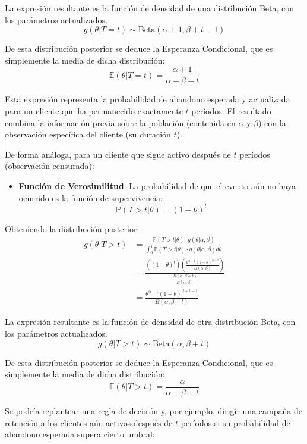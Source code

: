 \documentclass[
]{book}
\providecommand{\tightlist}{%
  \setlength{\itemsep}{0pt}\setlength{\parskip}{0pt}}
\begin{document}
La expresión resultante es la función de densidad de una distribución
Beta, con los parámetros actualizados.
\[g(\theta|T=t) \sim \text{Beta}(\alpha+1, \beta+t-1)\]

De esta distribución posterior se deduce la Esperanza Condicional, que
es simplemente la media de dicha distribución:
\[ \mathbb{E}(\theta|T=t) = \frac{\alpha+1}{\alpha+\beta+t} \]

Esta expresión representa la probabilidad de abandono esperada y
actualizada para un cliente que ha permanecido exactamente \(t\) períodos.
El resultado combina la información previa sobre la población (contenida
en \(\alpha\) y \(\beta\)) con la observación específica del cliente (su
duración \(t\)).

De forma análoga, para un cliente que sigue activo después de \(t\)
períodos (observación censurada):

\begin{itemize}
\tightlist
\item
  \textbf{Función de Verosimilitud}: La probabilidad de que el evento aún
  no haya ocurrido es la función de supervivencia:
  \[ \mathbb{P}(T>t|\theta) = (1-\theta)^{t} \]
\end{itemize}

Obteniendo la distribución posterior: \[
\begin{aligned}
g(\theta|T > t) &= \frac{\mathbb{P}(T > t|\theta) \cdot g(\theta|\alpha, \beta)}{\int_0^1 \mathbb{P}(T > t|\theta) \cdot g(\theta|\alpha, \beta) d\theta} \\
&= \frac{ \left( (1-\theta)^{t} \right) \left( \frac{\theta^{\alpha-1}(1-\theta)^{\beta-1}}{B(\alpha, \beta)} \right) }{ \frac{B(\alpha, \beta+t)}{B(\alpha, \beta)} } \\
&= \frac{\theta^{\alpha-1}(1-\theta)^{\beta+t-1}}{B(\alpha, \beta+t)}
\end{aligned}
\]

La expresión resultante es la función de densidad de otra distribución
Beta, con los parámetros actualizados.
\[g(\theta|T>t) \sim \text{Beta}(\alpha, \beta+t)\]

De esta distribución posterior se deduce la Esperanza Condicional, que
es simplemente la media de dicha distribución:
\[ \mathbb{E}(\theta|T>t) = \frac{\alpha}{\alpha+\beta+t} \]

Se podría replantear una regla de decisión y, por ejemplo, dirigir una
campaña de retención a los clientes aún activos después de \(t\) períodos
si su probabilidad de abandono esperada supera cierto umbral:
\end{document}
